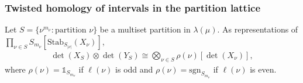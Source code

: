\documentclass[ALCO, Unicode]{cedram}
\def\stab{\mathrm{Stab}}
\def\sgn{\mathrm{sgn}}
\begin{document}
\subsubsection{Twisted homology of intervals in the partition lattice}\label{subsec:homology-intervals-lattice}

\begin{lemma} \label{lem:det-rep}
Let $S = \{\nu^{m_\nu}: \text{partition }\nu\}$ be a multiset partition in $\lambda(\mu).$ As representations of $ \prod_{\nu \in S}S_{m_\nu}[\stab_{S_{|\nu|}}(X_\nu)]$, 
\begin{align*}
    \det\left(X_{S}\right) \otimes \det\left(Y_S\right) \cong \bigotimes_{\nu \in S}\rho(\nu) \left[\det(X_\nu)\right],
\end{align*}
where $\rho(\nu) = \mathbb{1}_{S_{m_\nu}}$ if $\ell(\nu)$ is odd and $\rho(\nu) = \sgn_{S_{m_\nu}}$ if $\ell(\nu)$ is even.
\end{lemma}
\end{document}
